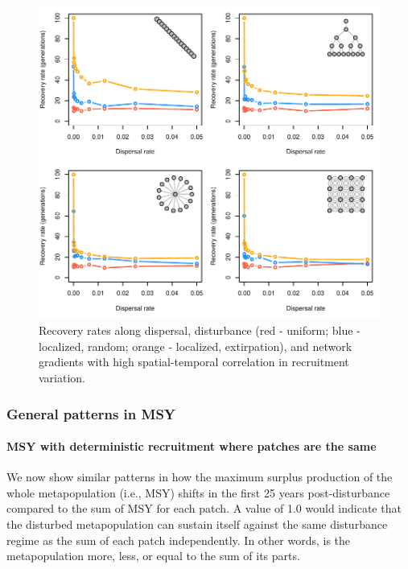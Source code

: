 \documentclass[]{article}
\let\oldparagraph\paragraph
\renewcommand{\paragraph}[1]{\oldparagraph{#1}\mbox{}}
\begin{document}
\begin{figure}[H]

{\centering \includegraphics{Managing_for_ecological_surprises_in_metapopulations_files/figure-latex/spatiotemporal correlation-1} 

}

\caption{Recovery rates along dispersal, disturbance (red - uniform; blue - localized, random; orange - localized, extirpation), and network gradients with high spatial-temporal correlation in recruitment variation.}\label{fig:spatiotemporal correlation}
\end{figure}
\newpage

\hypertarget{general-patterns-in-msy}{%
\subsubsection{General patterns in MSY}\label{general-patterns-in-msy}}

\hypertarget{msy-with-deterministic-recruitment-where-patches-are-the-same}{%
\paragraph{MSY with deterministic recruitment where patches are the
same}\label{msy-with-deterministic-recruitment-where-patches-are-the-same}}

We now show similar patterns in how the maximum surplus production of
the whole metapopulation (i.e., MSY) shifts in the first 25 years
post-disturbance compared to the sum of MSY for each patch. A value of
1.0 would indicate that the disturbed metapopulation can sustain itself
against the same disturbance regime as the sum of each patch
independently. In other words, is the metapopulation more, less, or
equal to the sum of its parts.
\end{document}
